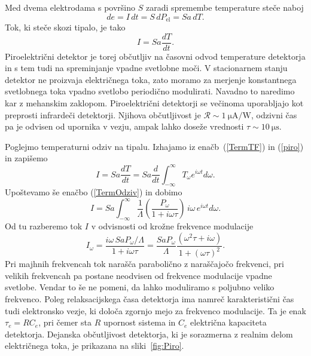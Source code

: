 Med dvema elektrodama s površino $S$ zaradi spremembe temperature steče naboj
\begin{equation}
de = I\, dt = S\, dP_\mathrm{el} = S a\, dT.
\end{equation}
Tok, ki steče skozi tipalo, je tako
\begin{equation}
I = S a \frac{dT}{dt}.
\label{piro}
\end{equation}
Piroelektrični detektor je torej občutljiv na časovni odvod temperature detektorja in s tem 
tudi na spreminjanje vpadne svetlobne moči. V stacionarnem stanju 
detektor ne proizvaja električnega toka, zato moramo za merjenje 
konstantnega svetlobnega toka vpadno svetlobo periodično modulirati.
Navadno to naredimo kar z mehanskim zaklopom. Piroelektrični detektorji
se večinoma uporabljajo kot preprosti infrardeči detektorji.
Njihova občutljivost je $\mathcal{R} \sim 1~\si{\micro\ampere/\watt}$, odzivni čas pa je odvisen od 
upornika v vezju, ampak lahko doseže vrednosti $\tau \sim 10~\si{\micro\second}$.

Poglejmo temperaturni odziv na tipalu. Izhajamo iz enačb~(\ref{TermTF}) in (\ref{piro})
in zapišemo
\begin{equation}
I = Sa \frac{dT}{dt} = Sa \frac{d}{dt} \int_{-\infty}^{\infty} T_\omega e^{i\omega t}d\omega.
\end{equation}
Upoštevamo še enačbo (\ref{TermOdziv}) in dobimo
\begin{equation}
I=Sa\int_{-\infty}^{\infty}\frac{1}{\Lambda}\left(\frac{P_\omega}{1+i \omega \tau}\right) \,i \omega\,
e^{i\omega t}d\omega.
\end{equation}
Od tu razberemo tok $I$ v odvisnosti od krožne frekvence modulacije
\begin{equation}
I_\omega = \frac{i \omega\, SaP_\omega/\Lambda}{1 + i \omega \tau} = 
\frac{SaP_\omega}{\Lambda}\frac{(\omega^2\tau + i \omega)}{1+(\omega\tau)^2}.
\end{equation}
Pri majhnih frekvencah tok narašča parabolično z naraščajočo frekvenci,
pri velikih frekvencah pa postane neodvisen od
frekvence modulacije vpadne svetlobe. Vendar to še ne pomeni, da lahko moduliramo s poljubno 
veliko frekvenco. Poleg relaksacijskega časa detektorja ima namreč karakteristični čas tudi
elektronsko vezje, ki določa zgornjo mejo za frekvenco modulacije. 
Ta je enak $\tau_e = RC_e$, pri čemer
sta $R$ upornost sistema in $C_e$ električna kapaciteta detektorja. Dejanska občutljivost detektorja, 
ki je sorazmerna z realnim delom električnega toka, je prikazana na sliki~\ref{fig:Piro}. 

